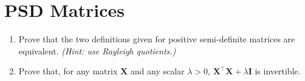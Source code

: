 \documentclass{article}
\begin{document}
\section{PSD Matrices}
\begin{enumerate}[label=\arabic*.]
\item Prove that the two definitions given for positive semi-definite matrices are equivalent. \textit{(Hint: use Rayleigh quotients.)}
\item Prove that, for any matrix $\mathbf{X}$ and any scalar $\lambda > 0$, $\mathbf{X^{\top}X} + \lambda\mathbf{I}$ is invertible.
\end{enumerate}
\end{document}
